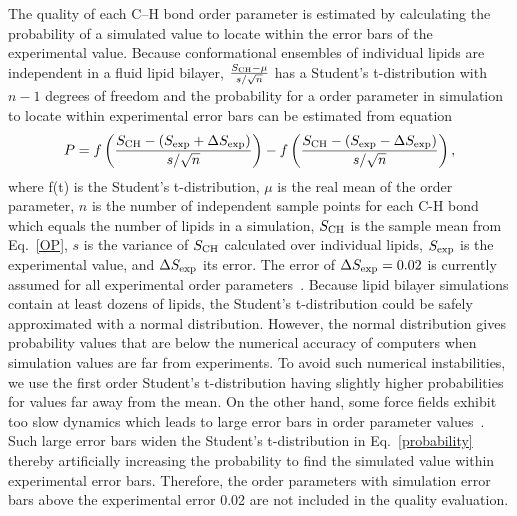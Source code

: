\documentclass[fleqn,10pt]{wlscirep}
\begin{document}
The quality of each C--H bond order parameter is estimated by calculating the probability of a simulated value to locate within the error bars of the experimental value. Because conformational ensembles of individual lipids are independent in a fluid lipid bilayer, 
$\frac{S_{\rm CH}-\mu}{s/\sqrt{n}}$ has a Student's t-distribution with $n-1$ degrees of freedom and the probability for a order parameter in simulation to locate within experimental error bars can be estimated from equation
\begin{equation}\label{probability}
  P = f \left( \frac{S_{\rm CH} - (S_{\rm exp}+\Delta S_{\rm exp})}{s/\sqrt{n}} \right) - f \left( \frac{S_{\rm CH} - (S_{\rm exp}-\Delta S_{\rm exp})}{s/\sqrt{n}} \right),
\end{equation}
where f(t) is the %
Student's t-distribution, $\mu$ is the real mean of the order parameter, $n$ is the number of independent sample points for each C-H bond which equals the number of lipids in a simulation, $S_{\rm CH}$ is the sample mean from Eq.~\ref{OP}, $s$ is the variance of $S_{\rm CH}$ calculated over individual lipids, $S_{\rm exp}$ is the experimental value, and $\Delta S_{\rm exp}$ its error. The error of $\Delta S_{\rm exp} = 0.02$ is currently assumed for all experimental order parameters~\cite{ollila16}. Because lipid bilayer simulations contain at least dozens of lipids, the Student's t-distribution could be safely approximated with a normal distribution. However, the normal distribution gives probability values that are below the numerical accuracy of computers when simulation values are far from experiments. To avoid such numerical instabilities, we use the first order Student's t-distribution having slightly higher probabilities for values far away from the mean.
On the other hand, some force fields exhibit too slow dynamics which leads to large error bars in order parameter values~\cite{antila21a}. Such large error bars widen the Student's t-distribution in Eq.~\ref{probability} thereby artificially increasing the probability to find the simulated value within experimental error bars. Therefore, the order parameters with simulation error bars above the experimental error 0.02 are not included in the quality evaluation.
\end{document}
